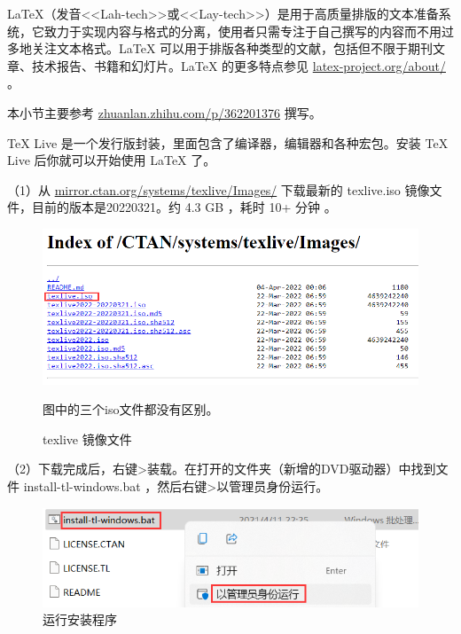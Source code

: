 \label{chap_tools}  %

\LaTeX{}（发音<<Lah-tech>>或<<Lay-tech>>）是用于高质量排版的文本准备系统，它致力于实现内容与格式的分离，使用者只需专注于自己撰写的内容而不用过多地关注文本格式。\LaTeX{} 可以用于排版各种类型的文献，包括但不限于期刊文章、技术报告、书籍和幻灯片。\LaTeX{} 的更多特点参见 \href{https://www.latex-project.org/about/}{latex-project.org/about/} 。


本小节主要参考 \href{https://zhuanlan.zhihu.com/p/362201376}{zhuanlan.zhihu.com/p/362201376} 撰写。

\TeX{} Live 是一个发行版封装，里面包含了编译器，编辑器和各种宏包。安装 \TeX{} Live 后你就可以开始使用 \LaTeX{} 了。

（1）从 \href{https://mirror.ctan.org/systems/texlive/Images/}{mirror.ctan.org/systems/texlive/Images/} 下载最新的 texlive.iso 镜像文件，目前的版本是20220321。约 4.3 GB ，耗时 10+ 分钟 。

\begin{figure}[H]  %
  \centering  %
  \includegraphics[scale=.5]{figure/thesis/texliveImages.png}  %

  { 图中的三个iso文件都没有区别。}  %
  \caption{texlive 镜像文件}  %
  \label{fig:tools:texliveImages}  %
\end{figure}

（2）下载完成后，右键>装载。在打开的文件夹（新增的DVD驱动器）中找到文件 install-tl-windows.bat ，然后右键>以管理员身份运行。

\begin{figure}[H]  %
  \centering  %
  \includegraphics[scale=.5]{figure/thesis/installbat.png}  %
  \caption{运行安装程序}  %
  \label{fig:tools:bat}  %
\end{figure}

